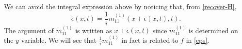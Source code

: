 \documentclass[11pt]{article}
\begin{document}
We can avoid the integral expression above by noticing that, from \eqref{recover-H}, 
\begin{equation} \label{eps-recover}
\epsilon(x,t)=\frac{1}{i}m_{11}^{(1)}(x+\epsilon(x,t),t).
\end{equation}
The argument of $m_{11}^{(1)}$ is written as $x+\epsilon(x,t)$ since $m_{11}^{(1)}$ is determined on the $y$ variable. We will see that $\frac{1}{i}m_{11}^{(1)}$ in fact is related to $f$ in \eqref{eps}.
\end{document}

